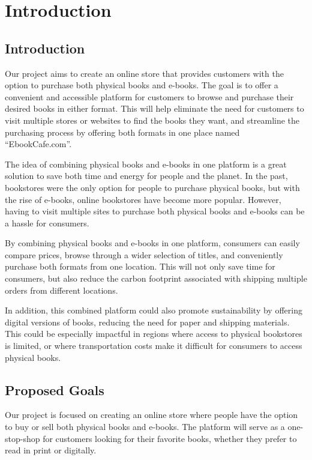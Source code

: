 \documentclass[12pt,a4paper]{article}
\begin{document}
\tableofcontents
\newpage








\section{Introduction}
\subsection{Introduction}
Our project aims to create an online store that provides customers with the option to purchase both physical books and e-books. The goal is to offer a convenient and accessible platform for customers to browse and purchase their desired books in either format. This will help eliminate the need for customers to visit multiple stores or websites to find the books they want, and streamline the purchasing process by offering both formats in one place named “EbookCafe.com”.

The idea of combining physical books and e-books in one platform is a great solution to save both time and energy for people and the planet. In the past, bookstores were the only option for people to purchase physical books, but with the rise of e-books, online bookstores have become more popular. However, having to visit multiple sites to purchase both physical books and e-books can be a hassle for consumers.

By combining physical books and e-books in one platform, consumers can easily compare prices, browse through a wider selection of titles, and conveniently purchase both formats from one location. This will not only save time for consumers, but also reduce the carbon footprint associated with shipping multiple orders from different locations.

In addition, this combined platform could also promote sustainability by offering digital versions of books, reducing the need for paper and shipping materials. This could be especially impactful in regions where access to physical bookstores is limited, or where transportation costs make it difficult for consumers to access physical books.
\subsection{Proposed Goals}
Our project is focused on creating an online store where people have the option to buy or sell both physical books and e-books. The platform will serve as a one-stop-shop for customers looking for their favorite books, whether they prefer to read in print or digitally.
\end{document}

